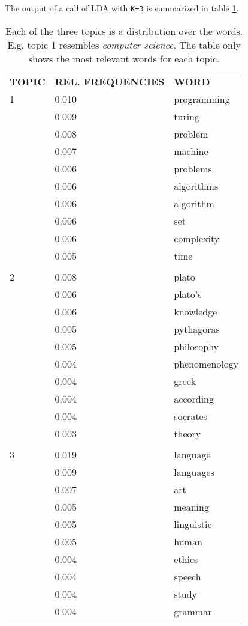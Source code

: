 \documentclass[a4paper,ngerman, english]{atseminar}
\begin{document}
                               
The output of a call of LDA with \texttt{K=3} is summarized in table \ref{table:lda_output}.


\begin{table}[h!]
\caption{Each of the three topics is a distribution over the words. E.g. topic 1 resembles \textit{computer science}.
The table only shows the most relevant words for each topic.}
\label{table:lda_output}
\begin{tabular}{l l l}
\textbf{TOPIC} & \textbf{REL. FREQUENCIES} & \textbf{WORD} \\

1  &   0.010 & programming  \\
    &   0.009 & turing \\
    &   0.008 & problem \\
    &   0.007 & machine \\
    &   0.006 & problems \\
    &   0.006 & algorithms\\
    &   0.006 & algorithm  \\
    &   0.006 & set \\
    &   0.006 & complexity \\ 
    &   0.005 & time  \\
 \hline \\
 2 &  0.008 & plato \\
    &  0.006 & plato's  \\
    &  0.006 & knowledge \\ 
    &  0.005 & pythagoras \\
    &  0.005 & philosophy  \\
    &  0.004 & phenomenology \\
    &  0.004 & greek  \\
    &  0.004 & according  \\ 
    &  0.004 & socrates  \\
    &  0.003 & theory \\
  \hline \\
3 & 0.019 & language \\
   & 0.009 & languages  \\
   & 0.007 & art \\
   & 0.005 & meaning \\ 
   & 0.005 & linguistic \\
   & 0.005 & human \\
   & 0.004 & ethics \\
   & 0.004 & speech \\
   & 0.004 & study \\
   & 0.004 & grammar 
\end{tabular}
\end{table}
\end{document}
